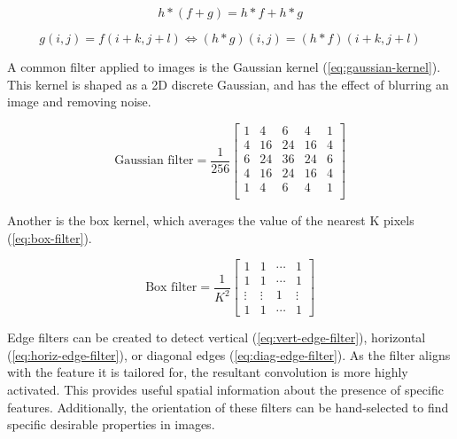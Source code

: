 \begin{equation}
    h *(f + g) = h*f + h*g
    \label{eq:superposition}
\end{equation}

\begin{equation}
    g(i,j) = f(i+k,j+l) \Longleftrightarrow (h*g)(i,j) = (h*f)(i+k,j+l)
    \label{eq:shift-invariance}
\end{equation}

A common filter applied to images is the Gaussian kernel (\cref{eq:gaussian-kernel}).
This kernel is shaped as a 2D discrete Gaussian, and has the effect of blurring an image and removing noise.

\begin{equation}
    \text{Gaussian filter}=\frac{1}{256}\begin{bmatrix}
        1 & 4 & 6 & 4 & 1 \\
        4 & 16 & 24 & 16 & 4\\
        6 & 24 & 36 & 24 & 6\\
        4 & 16 & 24 & 16 & 4\\
        1 & 4 & 6 & 4 & 1 \\
    \end{bmatrix}
    \label{eq:gaussian-kernel}
\end{equation}

Another is the box kernel, which averages the value of the nearest K pixels (\cref{eq:box-filter}).

\begin{equation}
    \text{Box filter} = \frac{1}{K^{2}}\begin{bmatrix}
        1 & 1 & \cdots &1\\
        1 & 1 & \cdots &1 \\
        \vdots & \vdots & 1 & \vdots \\
        1 & 1 & \cdots & 1
    \end{bmatrix}
    \label{eq:box-filter}
\end{equation}

Edge filters can be created to detect vertical (\cref{eq:vert-edge-filter}), horizontal (\cref{eq:horiz-edge-filter}), or diagonal edges (\cref{eq:diag-edge-filter}).
As the filter aligns with the feature it is tailored for, the resultant convolution is more highly activated.
This provides useful spatial information about the presence of specific features.
Additionally, the orientation of these filters can be hand-selected to find specific desirable properties in images.

